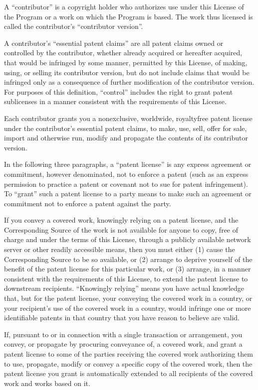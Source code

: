 \documentclass[letterpaper,10pt,english]{sphinxmanual}
\begin{document}
\sphinxAtStartPar
A “contributor” is a copyright holder who authorizes use under this License of the Program or a work on which the Program is based. The work thus licensed is called the contributor’s “contributor version”.

\sphinxAtStartPar
A contributor’s “essential patent claims” are all patent claims owned or controlled by the contributor, whether already acquired or hereafter acquired, that would be infringed by some manner, permitted by this License, of making, using, or selling its contributor version, but do not include claims that would be infringed only as a consequence of further modification of the contributor version. For purposes of this definition, “control” includes the right to grant patent sublicenses in a manner consistent with the requirements of this License.

\sphinxAtStartPar
Each contributor grants you a non\sphinxhyphen{}exclusive, worldwide, royalty\sphinxhyphen{}free patent license under the contributor’s essential patent claims, to make, use, sell, offer for sale, import and otherwise run, modify and propagate the contents of its contributor version.

\sphinxAtStartPar
In the following three paragraphs, a “patent license” is any express agreement or commitment, however denominated, not to enforce a patent (such as an express permission to practice a patent or covenant not to sue for patent infringement). To “grant” such a patent license to a party means to make such an agreement or commitment not to enforce a patent against the party.

\sphinxAtStartPar
If you convey a covered work, knowingly relying on a patent license, and the Corresponding Source of the work is not available for anyone to copy, free of charge and under the terms of this License, through a publicly available network server or other readily accessible means, then you must either (1) cause the Corresponding Source to be so available, or (2) arrange to deprive yourself of the benefit of the patent license for this particular work, or (3) arrange, in a manner consistent with the requirements of this License, to extend the patent license to downstream recipients. “Knowingly relying” means you have actual knowledge that, but for the patent license, your conveying the covered work in a country, or your recipient’s use of the covered work in a country, would infringe one or more identifiable patents in that country that you have reason to believe are valid.

\sphinxAtStartPar
If, pursuant to or in connection with a single transaction or arrangement, you convey, or propagate by procuring conveyance of, a covered work, and grant a patent license to some of the parties receiving the covered work authorizing them to use, propagate, modify or convey a specific copy of the covered work, then the patent license you grant is automatically extended to all recipients of the covered work and works based on it.
\end{document}
